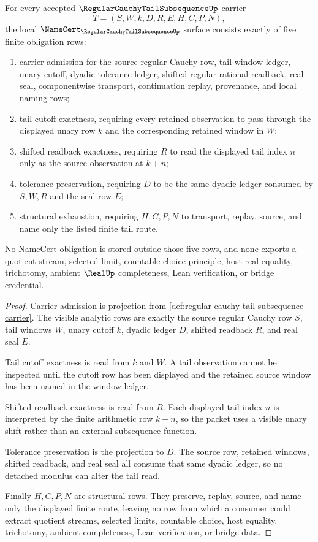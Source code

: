 \begin{theorem}
\label{thm:regular-cauchy-tail-subsequence-namecert-obligations}
For every accepted $\RegularCauchyTailSubsequenceUp$ carrier
$$
T=(S,W,k,D,R,E,H,C,P,N),
$$
the local $\NameCert_{\RegularCauchyTailSubsequenceUp}$ surface consists exactly of five finite obligation rows:
\begin{enumerate}
\item carrier admission for the source regular Cauchy row, tail-window ledger, unary cutoff, dyadic tolerance ledger, shifted regular rational readback, real seal, componentwise transport, continuation replay, provenance, and local naming rows;
\item tail cutoff exactness, requiring every retained observation to pass through the displayed unary row $k$ and the corresponding retained window in $W$;
\item shifted readback exactness, requiring $R$ to read the displayed tail index $n$ only as the source observation at $k+n$;
\item tolerance preservation, requiring $D$ to be the same dyadic ledger consumed by $S,W,R$ and the seal row $E$;
\item structural exhaustion, requiring $H,C,P,N$ to transport, replay, source, and name only the listed finite tail route.
\end{enumerate}
No NameCert obligation is stored outside those five rows, and none exports a quotient stream, selected limit, countable choice principle, host real equality, trichotomy, ambient $\RealUp$ completeness, Lean verification, or bridge credential.
\end{theorem}
\begin{proof}
Carrier admission is projection from \autoref{def:regular-cauchy-tail-subsequence-carrier}. The visible analytic rows are exactly the source regular Cauchy row $S$, tail windows $W$, unary cutoff $k$, dyadic ledger $D$, shifted readback $R$, and real seal $E$.

Tail cutoff exactness is read from $k$ and $W$. A tail observation cannot be inspected until the cutoff row has been displayed and the retained source window has been named in the window ledger.

Shifted readback exactness is read from $R$. Each displayed tail index $n$ is interpreted by the finite arithmetic row $k+n$, so the packet uses a visible unary shift rather than an external subsequence function.

Tolerance preservation is the projection to $D$. The source row, retained windows, shifted readback, and real seal all consume that same dyadic ledger, so no detached modulus can alter the tail read.

Finally $H,C,P,N$ are structural rows. They preserve, replay, source, and name only the displayed finite route, leaving no row from which a consumer could extract quotient streams, selected limits, countable choice, host equality, trichotomy, ambient completeness, Lean verification, or bridge data.
\end{proof}

